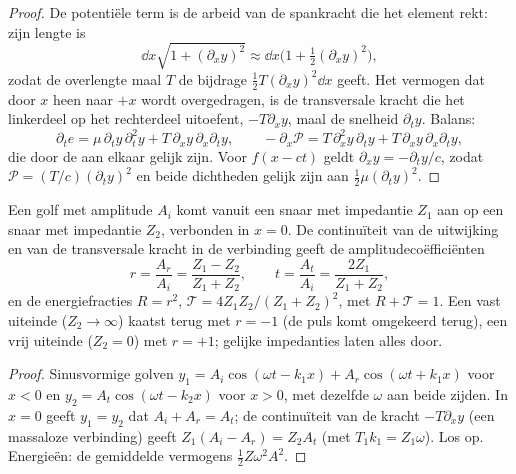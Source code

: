 \begin{proof}
De potentiële term is de arbeid van de spankracht die het element rekt: zijn
lengte is
\[
\dd x\sqrt{1 + (\partial_xy)^2} \approx \dd x\bigl(1 + \tfrac12(\partial_xy)^2\bigr) ,
\]
zodat de overlengte maal $T$ de bijdrage $\tfrac12T(\partial_xy)^2\dd x$
geeft. Het vermogen dat door $x$ heen naar $+x$ wordt overgedragen, is de
transversale kracht die het linkerdeel op het rechterdeel uitoefent,
$-T\partial_xy$, maal de snelheid $\partial_ty$. Balans:
\[
\partial_te = \mu\,\partial_ty\,\partial_t^2y + T\,\partial_xy\,\partial_x\partial_ty ,
\qquad
-\partial_x\mathcal P = T\,\partial_x^2y\,\partial_ty + T\,\partial_xy\,\partial_x\partial_ty ,
\]
die door de  aan elkaar gelijk zijn. Voor $f(x - ct)$ geldt
$\partial_xy = -\partial_ty/c$, zodat $\mathcal P = (T/c)
(\partial_ty)^2$
en beide dichtheden gelijk zijn aan $\tfrac12\mu(\partial_ty)^2$.
\end{proof}

\begin{proposition}\label{prop:b2:waves-on-strings:junction}
Een golf met amplitude $A_i$ komt vanuit een snaar met impedantie $Z_1$ aan
op een snaar met impedantie $Z_2$, verbonden in $x = 0$. De continuïteit van
de uitwijking en van de transversale kracht in de verbinding geeft de
amplitudecoëfficiënten
\[
r = \frac{A_r}{A_i} = \frac{Z_1 - Z_2}{Z_1 + Z_2} , \qquad
t = \frac{A_t}{A_i} = \frac{2Z_1}{Z_1 + Z_2} ,
\]
en de energiefracties $R = r^2$, $\mathcal T = 4Z_1Z_2/(Z_1 + Z_2)^2$, met
$R + \mathcal T = 1$. Een vast uiteinde ($Z_2 \to \infty$) kaatst terug met
$r = -1$ (de puls komt omgekeerd terug), een vrij uiteinde ($Z_2 = 0$) met
$r = +1$; gelijke impedanties laten alles door.
\end{proposition}

\begin{proof}
Sinusvormige golven
$y_1 = A_i\cos(\omega t - k_1x) + A_r\cos(\omega t + k_1x)$ voor $x < 0$ en
$y_2 = A_t\cos(\omega t - k_2x)$ voor $x > 0$, met dezelfde $\omega$ aan
beide zijden. In $x = 0$ geeft $y_1 = y_2$ dat $A_i + A_r = A_t$; de
continuïteit van de kracht $-T\partial_xy$ (een massaloze verbinding) geeft
$Z_1(A_i - A_r) = Z_2A_t$ (met $T_1k_1 = Z_1\omega$). Los op. Energieën: de
gemiddelde vermogens $\tfrac12Z\omega^2A^2$.
\end{proof}

